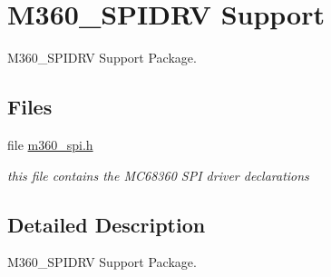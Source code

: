 \hypertarget{group__m68k__m360spi}{}\section{M360\+\_\+\+S\+P\+I\+D\+RV Support}
\label{group__m68k__m360spi}


M360\+\_\+\+S\+P\+I\+D\+RV Support Package.  


\subsection*{Files}
\begin{DoxyCompactItemize}
\item 
file \mbox{\hyperlink{m360__spi_8h}{m360\+\_\+spi.\+h}}
\begin{DoxyCompactList}\small\item\em this file contains the M\+C68360 S\+PI driver declarations \end{DoxyCompactList}\end{DoxyCompactItemize}


\subsection{Detailed Description}
M360\+\_\+\+S\+P\+I\+D\+RV Support Package. 


